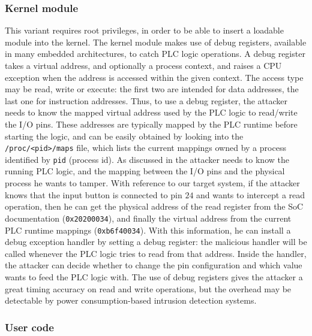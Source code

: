 \subsubsection{Kernel module}
This variant requires root privileges, in order to be able to insert a loadable module into the kernel.
The kernel module makes use of debug registers, available in many embedded architectures, to catch PLC logic operations.
A debug register takes a virtual address, and optionally a process context, and raises a CPU exception when the address is accessed within the given context.
The access type may be read, write or execute: the first two are intended for data addresses, the last one for instruction addresses.
Thus, to use a debug register, the attacker needs to know the mapped virtual address used by the PLC logic to read/write the I/O pins.
These addresses are typically mapped by the PLC runtime before starting the logic, and can be easily obtained by looking into the \verb|/proc/<pid>/maps|
file, which lists the current mappings owned by a process identified by \verb|pid| (process id).
As discussed in  the attacker needs to know the running PLC logic, and the mapping between the I/O pins and
the physical process he wants to tamper. With reference to our target system, if the attacker knows that the input button is connected to pin $24$
and wants to intercept a read operation, then he can get the physical address of the read register from the SoC documentation \cite{bcm2835} (\verb|0x20200034|),
and finally the virtual address from the current PLC runtime mappings (\eg \verb|0xb6f40034|). With this information, he can install a debug exception handler
by setting a debug register: the malicious handler will be called whenever the PLC logic tries to read from that address.
Inside the handler, the attacker can decide whether to change the pin configuration and which value wants to feed the PLC logic with.
The use of debug registers gives the attacker a great timing accuracy on read and write operations,
but the overhead may be detectable by power consumption-based intrusion detection systems.


\subsubsection{User code}


